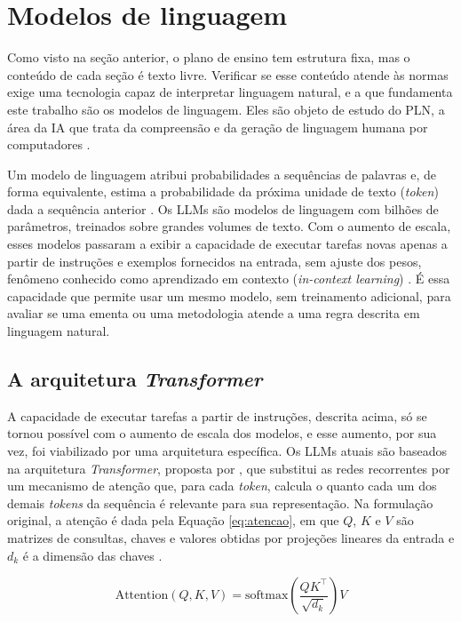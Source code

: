 \section{Modelos de linguagem}
\label{sec:llm}

Como visto na seção anterior, o plano de ensino tem estrutura fixa, mas o conteúdo de cada seção é texto livre. Verificar se esse conteúdo atende às normas exige uma tecnologia capaz de interpretar linguagem natural, e a que fundamenta este trabalho são os modelos de linguagem. Eles são objeto de estudo do PLN, a área da IA que trata da compreensão e da geração de linguagem humana por computadores \cite{RussellNorvig2021, Jurafsky2025}.

Um modelo de linguagem atribui probabilidades a sequências de palavras e, de forma equivalente, estima a probabilidade da próxima unidade de texto (\textit{token}) dada a sequência anterior \cite{Jurafsky2025}. Os LLMs são modelos de linguagem com bilhões de parâmetros, treinados sobre grandes volumes de texto. Com o aumento de escala, esses modelos passaram a exibir a capacidade de executar tarefas novas apenas a partir de instruções e exemplos fornecidos na entrada, sem ajuste dos pesos, fenômeno conhecido como aprendizado em contexto (\textit{in-context learning}) \cite{Brown2020, Zhao2023}. É essa capacidade que permite usar um mesmo modelo, sem treinamento adicional, para avaliar se uma ementa ou uma metodologia atende a uma regra descrita em linguagem natural.

\subsection{A arquitetura \textit{Transformer}}

A capacidade de executar tarefas a partir de instruções, descrita acima, só se tornou possível com o aumento de escala dos modelos, e esse aumento, por sua vez, foi viabilizado por uma arquitetura específica. Os LLMs atuais são baseados na arquitetura \textit{Transformer}, proposta por , que substitui as redes recorrentes por um mecanismo de atenção que, para cada \textit{token}, calcula o quanto cada um dos demais \textit{tokens} da sequência é relevante para sua representação. Na formulação original, a atenção é dada pela Equação \ref{eq:atencao}, em que $Q$, $K$ e $V$ são matrizes de consultas, chaves e valores obtidas por projeções lineares da entrada e $d_k$ é a dimensão das chaves \cite{Vaswani2017}.

\begin{equation}
\label{eq:atencao}
\mathrm{Attention}(Q, K, V) = \mathrm{softmax}\left(\frac{QK^{\top}}{\sqrt{d_k}}\right)V
\end{equation}

